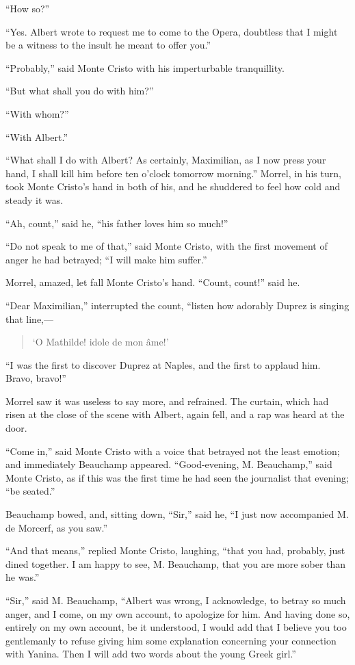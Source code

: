 “How so?”

“Yes. Albert wrote to request me to come to the Opera, doubtless that I
might be a witness to the insult he meant to offer you.”

“Probably,” said Monte Cristo with his imperturbable tranquillity.

“But what shall you do with him?”

“With whom?”

“With Albert.”

“What shall I do with Albert? As certainly, Maximilian, as I now press
your hand, I shall kill him before ten o’clock tomorrow morning.”
Morrel, in his turn, took Monte Cristo’s hand in both of his, and he
shuddered to feel how cold and steady it was.

“Ah, count,” said he, “his father loves him so much!”

“Do not speak to me of that,” said Monte Cristo, with the first
movement of anger he had betrayed; “I will make him suffer.”

Morrel, amazed, let fall Monte Cristo’s hand. “Count, count!” said he.

“Dear Maximilian,” interrupted the count, “listen how adorably Duprez
is singing that line,—

\begin{quote}
{\small‘O Mathilde! idole de mon âme!’}
\end{quote}

“I was the first to discover Duprez at Naples, and the first to applaud
him. Bravo, bravo!”

Morrel saw it was useless to say more, and refrained. The curtain,
which had risen at the close of the scene with Albert, again fell, and
a rap was heard at the door.

“Come in,” said Monte Cristo with a voice that betrayed not the least
emotion; and immediately Beauchamp appeared. “Good-evening, M.
Beauchamp,” said Monte Cristo, as if this was the first time he had
seen the journalist that evening; “be seated.”

Beauchamp bowed, and, sitting down, “Sir,” said he, “I just now
accompanied M. de Morcerf, as you saw.”

“And that means,” replied Monte Cristo, laughing, “that you had,
probably, just dined together. I am happy to see, M. Beauchamp, that
you are more sober than he was.”

“Sir,” said M. Beauchamp, “Albert was wrong, I acknowledge, to betray
so much anger, and I come, on my own account, to apologize for him. And
having done so, entirely on my own account, be it understood, I would
add that I believe you too gentlemanly to refuse giving him some
explanation concerning your connection with Yanina. Then I will add two
words about the young Greek girl.”

